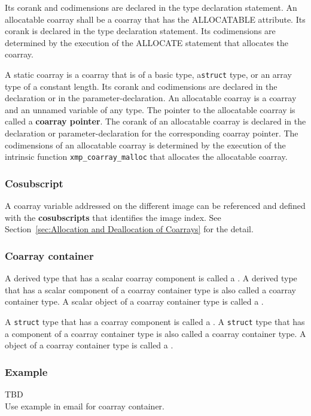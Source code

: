 Its corank and codimensions are declared in the type declaration statement.
%
An allocatable coarray shall be a coarray that has the ALLOCATABLE attribute.
Its corank is declared in the type declaration statement.
Its codimensions are determined by the execution of the ALLOCATE statement
that allocates the coarray.

{\onlyC} 
A static coarray is a coarray that is of a basic type, a{\tt struct} type, 
or an array type of a constant length.
Its corank and codimensions are declared in the declaration or in the 
parameter-declaration.
%
An allocatable coarray is a coarray and an unnamed variable of any type.
The pointer to the allocatable coarray is called a {\bf coarray pointer}.
The corank of an allocatable coarray is declared in the declaration or 
parameter-declaration for the corresponding coarray pointer.
The codimensions of an allocatable coarray is determined by the execution of
the intrinsic function {\tt xmp\_coarray\_malloc} that 
allocates the allocatable coarray.

\subsubsection*{Cosubscript}
A coarray variable addressed on the different image can be 
referenced and defined with the {\bf cosubscripts} that identifies the image index.
See Section~\ref{sec:Allocation and Deallocation of Coarrays} for the detail.

\subsubsection*{Coarray container}
{\onlyF}
A derived type that has a scalar coarray component is called 
a .
A derived type that has a scalar component of a coarray container type 
is also called a coarray container type.
A scalar object of a coarray container type is called 
a .

{\onlyC}
A {\tt struct} type that has a coarray component is called 
a .
A {\tt struct} type that has a component of a coarray container type 
is also called a coarray container type.
A object of a coarray container type is called 
a .

\subsubsection*{Example}
TBD\\
Use example in email for coarray container.


